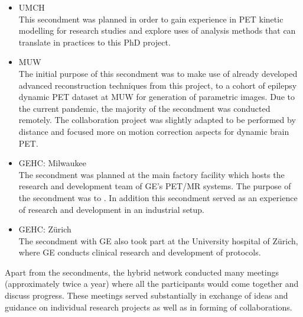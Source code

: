\begin{itemize}
    \item UMCH \\
    This secondment was planned in order to gain experience in PET kinetic modelling for research studies and explore uses of analysis methods that can translate in practices to this PhD project. 
    \item MUW \\
    The initial purpose of this secondment was to make use of already developed advanced reconstruction techniques from this project, to a cohort of epilepsy dynamic PET dataset at MUW for generation of parametric images. Due to the current pandemic, the majority of the secondment was conducted remotely. The collaboration project was slightly adapted to be performed by distance and focused more on motion correction aspects for dynamic brain PET. 
    \item GEHC: Milwaukee \\
    The secondment was planned at the main factory facility which hosts the research and development team of GE's PET/MR systems. The purpose of the secondment was to .
    In addition this secondment served as an experience of research and development in an industrial setup.
    \item GEHC: Zürich \\
    The secondment with GE also took part at the University hospital of Zürich, where GE conducts clinical research and development of protocols. 
\end{itemize}

Apart from the secondments, the \gls{hybrid} network conducted many meetings (approximately twice a year) where all the participants would come together and discuss progress. These meetings served substantially in exchange of ideas and guidance on individual research projects as well as in forming of collaborations. 

